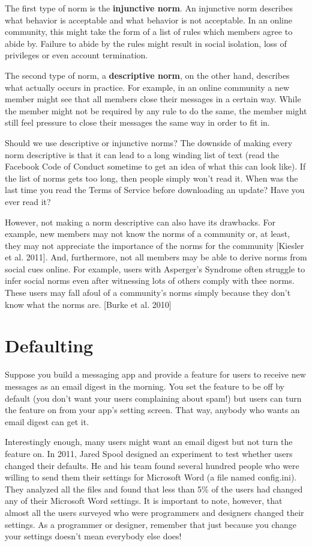 \documentclass[class=book, crop=false]{standalone}
\providecommand{\keyterm}[1]{\textbf{#1}\marginnote{\scriptsize \textbf{#1}}}
\begin{document}
The first type of norm is the \keyterm{injunctive norm}. An injunctive norm describes what behavior is acceptable and what behavior is not acceptable. In an online community, this might take the form of a list of rules which members agree to abide by. Failure to abide by the rules might result in social isolation, loss of privileges or even account termination.

The second type of norm, a \keyterm{descriptive norm}, on the other hand, describes what actually occurs in practice. For example, in an online community a new member might see that all members close their messages in a certain way. While the member might not be required by any rule to do the same, the member might still feel pressure to close their messages the same way in order to fit in.

Should we use descriptive or injunctive norms? The downside of making every norm descriptive is that it can lead to a long winding list of text (read the Facebook Code of Conduct sometime to get an idea of what this can look like). If the list of norms gets too long, then people simply won't read it. When was the last time you read the Terms of Service before downloading an update? Have you ever read it?

However, not making a norm descriptive can also have its drawbacks. For example, new members may not know the norms of a community or, at least, they may not appreciate the importance of the norms for the community [Kiesler et al. 2011]. And, furthermore, not all members may be able to derive norms from social cues online. For example, users with Asperger's Syndrome often struggle to infer social norms even after witnessing lots of others comply with thee norms. These users may fall afoul of a community's norms simply because they don't know what the norms are. [Burke et al. 2010]

\section{Defaulting}

Suppose you build a messaging app and provide a feature for users to receive new messages as an email digest in the morning. You set the feature to be off by default (you don't want your users complaining about spam!) but users can turn the feature on from your app's setting screen. That way, anybody who wants an email digest can get it.

Interestingly enough, many users might want an email digest but not turn the feature on. In 2011, Jared Spool designed an experiment to test whether users changed their defaults. He and his team found several hundred people who were willing to send them their settings for Microsoft Word (a file named config.ini). They analyzed all the files and found that less than 5\% of the users had changed any of their Microsoft Word settings. It is important to note, however, that almost all the users surveyed who were programmers and designers changed their settings. As a programmer or designer, remember that just because you change your settings doesn't mean everybody else does!
\end{document}
